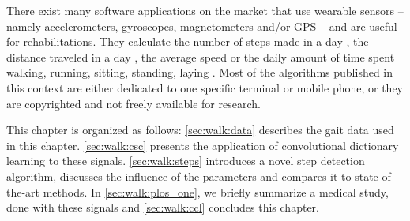 \documentclass[../thesis.tex]{subfiles}
\begin{document}
There exist many software applications on the market that use wearable sensors -- namely accelerometers, gyroscopes, magnetometers and/or GPS -- and are useful for rehabilitations. They calculate the number of steps made in a day \citep{tran2012high, naqvi2012step}, the distance traveled in a day \citep{renaudin2012step, kim2004step}, the average speed or the daily amount of time spent walking, running, sitting, standing, laying \citep{oner2012towards, brajdic2013walk}. Most of the algorithms published in this context are either dedicated to one specific terminal or mobile phone, or they are copyrighted and not freely available for research.


This chapter is organized as follows: \autoref{sec:walk:data} describes the gait data used in this chapter. \autoref{sec:walk:csc} presents the application of convolutional dictionary learning to these signals. \autoref{sec:walk:steps} introduces a novel step detection algorithm, discusses the influence of the parameters and compares it to state-of-the-art methods. In \autoref{sec:walk:plos_one}, we briefly summarize a medical study, done with these signals and \autoref{sec:walk:ccl} concludes this chapter.



\biblio{}
\end{document}
